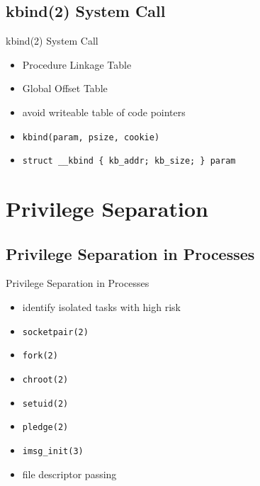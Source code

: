 \documentclass[14pt]{beamer}
\begin{document}
\subsection{kbind(2) System Call}
\begin{frame}{kbind(2) System Call}
\begin{itemize}
    \item Procedure Linkage Table
    \item Global Offset Table
    \item avoid writeable table of code pointers
    \item \texttt{kbind(param, psize, cookie)}
    \item \texttt{struct \_\_kbind \{ kb\_addr; kb\_size; \} param}
\end{itemize}
\end{frame}

\section{Privilege Separation}

\subsection{Privilege Separation in Processes}
\begin{frame}{Privilege Separation in Processes}
\begin{itemize}
    \item identify isolated tasks with high risk
    \item \texttt{socketpair(2)}
    \item \texttt{fork(2)}
    \item \texttt{chroot(2)}
    \item \texttt{setuid(2)}
    \item \texttt{pledge(2)}
    \item \texttt{imsg\_init(3)}
    \item file descriptor passing
\end{itemize}
\end{frame}
\end{document}
